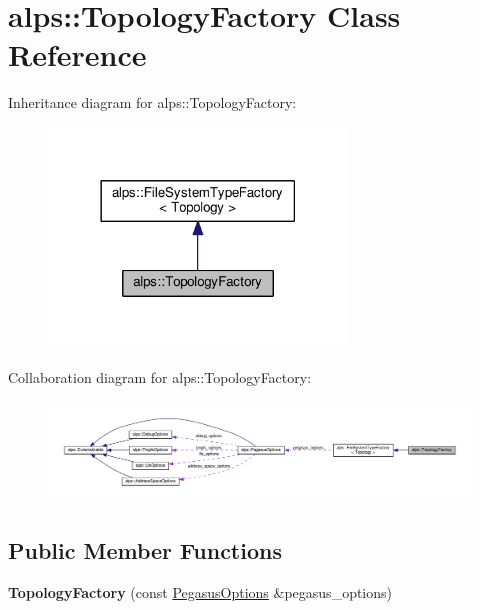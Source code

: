 \hypertarget{classalps_1_1TopologyFactory}{}\section{alps\+:\+:Topology\+Factory Class Reference}
\label{classalps_1_1TopologyFactory}


Inheritance diagram for alps\+:\+:Topology\+Factory\+:
\nopagebreak
\begin{figure}[H]
\begin{center}
\leavevmode
\includegraphics[width=225pt]{classalps_1_1TopologyFactory__inherit__graph}
\end{center}
\end{figure}


Collaboration diagram for alps\+:\+:Topology\+Factory\+:
\nopagebreak
\begin{figure}[H]
\begin{center}
\leavevmode
\includegraphics[width=350pt]{classalps_1_1TopologyFactory__coll__graph}
\end{center}
\end{figure}
\subsection*{Public Member Functions}
\begin{DoxyCompactItemize}
\item 
{\bfseries Topology\+Factory} (const \hyperlink{structalps_1_1PegasusOptions}{Pegasus\+Options} \&pegasus\+\_\+options)\hypertarget{classalps_1_1TopologyFactory_a7593660e90292efe41e14d8ac4095a4c}{}\label{classalps_1_1TopologyFactory_a7593660e90292efe41e14d8ac4095a4c}

\end{DoxyCompactItemize}
